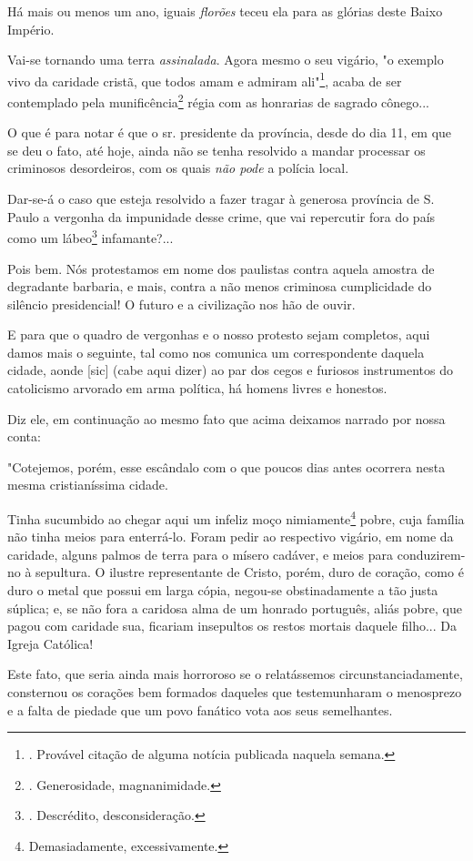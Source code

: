 Há mais ou menos um ano, iguais \emph{florões} teceu ela para as glórias
deste Baixo Império.

Vai-se tornando uma terra \emph{assinalada}. Agora mesmo o seu vigário,
"o exemplo vivo da caridade cristã, que todos amam e admiram
ali"\footnote{. Provável citação de alguma notícia publicada naquela
  semana.}, acaba de ser contemplado pela munificência\footnote{.
  Generosidade, magnanimidade.} régia com as honrarias de sagrado
cônego...

O que é para notar é que o sr. presidente da província, desde do dia 11,
em que se deu o fato, até hoje, ainda não se tenha resolvido a mandar
processar os criminosos desordeiros, com os quais \emph{não pode} a
polícia local.

Dar-se-á o caso que esteja resolvido a fazer tragar à generosa província
de S. Paulo a vergonha da impunidade desse crime, que vai repercutir
fora do país como um lábeo\footnote{. Descrédito, desconsideração.}
infamante?...

Pois bem. Nós protestamos em nome dos paulistas contra aquela amostra de
degradante barbaria, e mais, contra a não menos criminosa cumplicidade
do silêncio presidencial! O futuro e a civilização nos hão de ouvir.

E para que o quadro de vergonhas e o nosso protesto sejam completos,
aqui damos mais o seguinte, tal como nos comunica um correspondente
daquela cidade, aonde {[}sic{]} (cabe aqui dizer) ao par dos cegos e
furiosos instrumentos do catolicismo arvorado em arma política, há
homens livres e honestos.

Diz ele, em continuação ao mesmo fato que acima deixamos narrado por
nossa conta:

"Cotejemos, porém, esse escândalo com o que poucos dias antes ocorrera
nesta mesma cristianíssima cidade.

Tinha sucumbido ao chegar aqui um infeliz moço nimiamente\footnote{Demasiadamente,
  excessivamente.} pobre, cuja família não tinha meios para enterrá-lo.
Foram pedir ao respectivo vigário, em nome da caridade, alguns palmos de
terra para o mísero cadáver, e meios para conduzirem-no à sepultura. O
ilustre representante de Cristo, porém, duro de coração, como é duro o
metal que possui em larga cópia, negou-se obstinadamente a tão justa
súplica; e, se não fora a caridosa alma de um honrado português, aliás
pobre, que pagou com caridade sua, ficariam insepultos os restos mortais
daquele filho... Da Igreja Católica!

Este fato, que seria ainda mais horroroso se o relatássemos
circunstanciadamente, consternou os corações bem formados daqueles que
testemunharam o menosprezo e a falta de piedade que um povo fanático
vota aos seus semelhantes.

